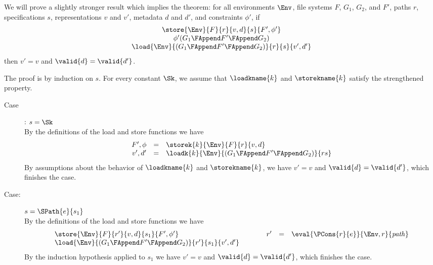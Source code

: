 %
{ We will prove a slightly stronger result which implies the theorem:
  for all environments $\Env$, file systems $F$, $G_1$, $G_2$, and
  $F'$, paths $r$, specifications $s$, representations $v$ and $v'$,
  metadata $d$ and $d'$, and constraints $\phi'$, if 
%
\[
\begin{array}{c}
  \store{\Env}{F}{r}{v,d}{s}{F',\phi'}\\
  \phi'(G_1 \FAppend F' \FAppend G_2)\\
  \load{\Env}{(G_1 \FAppend F' \FAppend G_2)}{r}{s}{v',d'}
\end{array}
\]
%
then $v' = v$ and $\valid{d} = \valid{d'}$. 

The proof is by induction on $s$. For every constant $\Sk$, we assume
that $\loadkname{k}$ and $\storekname{k}$ satisfy the strengthened
property.
\begin{description}
\item[Case]: $s = \Sk$\\[1ex]
%
By the definitions of the load and store functions we have 
\[ 
\begin{array}{rcll}
F',\phi &=& \storek{k}{\Env}{F}{r}{v,d}\\
v',d'  &=& \loadk{k}{\Env}{(G_1 \FAppend F' \FAppend G_2)}{rs}\\
\end{array}
\]
By assumptions about the behavior of $\loadkname{k}$ and
$\storekname{k}$, we have $v' = v$ and $\valid{d} = \valid{d'}$,
which finishes the case. 

\item[Case:] $s=\SPath{e}{s_1}$\\[1ex]
%
By the definitions of the load and store functions we have
\[
\begin{array}{l}
\store{\Env}{F}{r'}{v,d}{s_1}{F',\phi'}\\
\load{\Env}{(G_1 \FAppend F' \FAppend G_2)}{r'}{s_1}{v',d'}
\end{array}\hspace*{1cm}\begin{array}{rcl}
r' &=& \eval{\PCons{r}{e}}{\Env,r}{\mathit{path}}\\
\\
\end{array}
\]
%
By the induction hypothesis applied to $s_1$ we have $v' = v$ and
$\valid{d} = \valid{d'}$, which finishes the case.


\end{description}}
